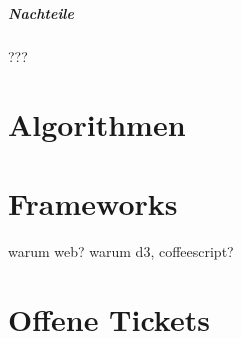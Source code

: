 \documentclass[color,german]{tudbook}
\begin{document}
\paragraph{Nachteile}
???

\chapter{Algorithmen}

\chapter{Frameworks}
warum web?
warum d3, coffeescript?

\chapter{Offene Tickets}


\end{document}
